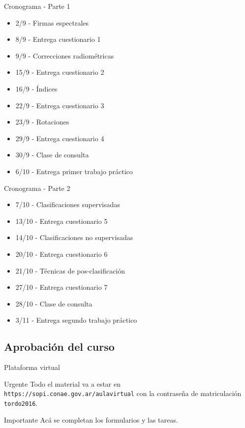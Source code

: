\documentclass[handout,draft]{beamer}
\begin{document}
\begin{frame}{Cronograma - Parte 1}
  \begin{itemize}
    \item 2/9 - Firmas espectrales
    \item 8/9 - Entrega cuestionario 1
    \item 9/9 - Correcciones radiométricas
    \item 15/9 - Entrega cuestionario 2
    \item 16/9 - Índices
    \item 22/9 - Entrega cuestionario 3
    \item 23/9 - Rotaciones
    \item 29/9 - Entrega cuestionario 4
    \item 30/9 - Clase de consulta
    \item 6/10 - Entrega primer trabajo práctico
  \end{itemize}
\end{frame}
\begin{frame}{Cronograma - Parte 2}
  \begin{itemize}
    \item 7/10 - Clasificaciones supervisadas
    \item 13/10 - Entrega cuestionario 5
    \item 14/10 - Clasificaciones no supervisadas
    \item 20/10 - Entrega cuestionario 6
    \item 21/10 - Técnicas de pos-clasificación
    \item 27/10 - Entrega cuestionario 7
    \item 28/10 - Clase de consulta
    \item 3/11 - Entrega segundo trabajo práctico
  \end{itemize}
\end{frame}

\subsection{Aprobación del curso}
\begin{frame}{Plataforma virtual}
  \begin{block}{Urgente}
    Todo el material va a estar en
    \texttt{https://sopi.conae.gov.ar/aulavirtual}\pause
    con la contraseña de matriculación
    \texttt{tordo2016}.
  \end{block}\pause
  \begin{alertblock}{Importante}
    Acá se completan los formularios y las tareas.
  \end{alertblock}
\end{frame}
\end{document}
